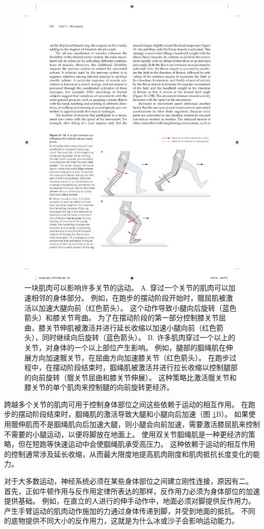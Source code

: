 \begin{figure}[htbp]
	\centering
	\includegraphics[width=0.7\linewidth]{chap31/fig_31_16}
	\caption{一块肌肉可以影响许多关节的运动。 A. 穿过一个关节的肌肉可以加速相邻的身体部分。 例如，在跑步的摆动阶段开始时，髋屈肌被激活以加速大腿向前（红色箭头）。 这个动作导致小腿向后旋转（蓝色箭头）和膝关节弯曲。 为了在摆动阶段的第一部分控制膝关节屈曲，膝关节伸肌被激活并进行延长收缩以加速小腿向前（红色箭头），同时继续向后旋转（蓝色箭头）。 B. 许多肌肉穿过一个以上的关节，对身体的一个以上部位产生影响。 例如，腿部的腘绳肌在伸展方向加速髋关节，在屈曲方向加速膝关节（红色箭头）。 在跑步过程中，在摆动阶段结束时，腘绳肌被激活并进行拉长收缩以控制腿部的向前旋转（髋关节屈曲和膝关节伸展）。 这种策略比激活髋关节和膝关节的单个肌肉来控制腿的向前旋转更经济。}
	\label{fig:31_16}
\end{figure}

跨越多个关节的肌肉可用于控制身体部位之间这些依赖于运动的相互作用。 在跑步的摆动阶段结束时，腘绳肌的激活导致大腿和小腿向后加速（图 \ref{fig:31_16}B）。 如果使用髋伸肌而不是腘绳肌向后加速大腿，则小腿会向前加速，需要激活膝屈肌来控制不需要的小腿运动，以便将脚放在地面上。 使用双关节腘绳肌是一种更经济的策略，但在短跑等快速运动中会使腘绳肌承受高压力。 这种依赖于运动的相互作用的控制通常涉及延长收缩，从而最大限度地提高肌肉刚度和肌肉抵抗长度变化的能力。

对于大多数运动，神经系统必须在某些身体部位之间建立刚性连接，原因有二。 首先，正如牛顿作用与反作用定律所表达的那样，反作用力必须为身体部位的加速提供基础。 例如，在直立的人进行的伸手动作中，地面必须对脚提供反作用力。 产生手臂运动的肌肉动作施加的力通过身体传递到脚，并受到地面的抵抗。 不同的底物提供不同大小的反作用力，这就是为什么冰或沙子会影响运动能力。

